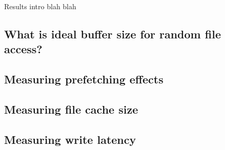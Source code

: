 Results intro blah blah

\subsection{What is ideal buffer size for random file access?}


\subsection{Measuring prefetching effects}


\subsection{Measuring file cache size}


\subsection{Measuring write latency}
